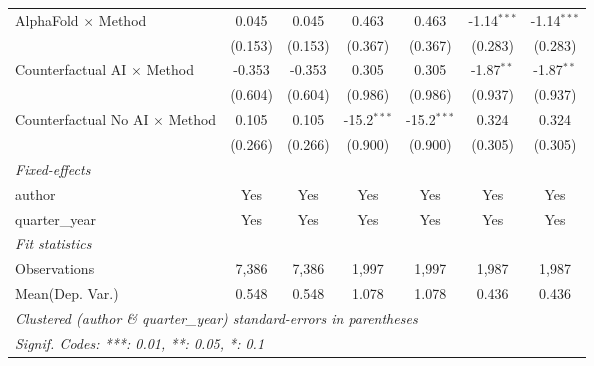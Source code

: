 \begin{tabular}{lcccccc}
   AlphaFold $\times$ Method             & 0.045         & 0.045         & 0.463         & 0.463         & -1.14$^{***}$ & -1.14$^{***}$\\   
                                         & (0.153)       & (0.153)       & (0.367)       & (0.367)       & (0.283)       & (0.283)\\   
   Counterfactual AI $\times$ Method     & -0.353        & -0.353        & 0.305         & 0.305         & -1.87$^{**}$  & -1.87$^{**}$\\   
                                         & (0.604)       & (0.604)       & (0.986)       & (0.986)       & (0.937)       & (0.937)\\   
   Counterfactual No AI $\times$ Method  & 0.105         & 0.105         & -15.2$^{***}$ & -15.2$^{***}$ & 0.324         & 0.324\\   
                                         & (0.266)       & (0.266)       & (0.900)       & (0.900)       & (0.305)       & (0.305)\\   
   \midrule
   \emph{Fixed-effects}\\
   author                                & Yes           & Yes           & Yes           & Yes           & Yes           & Yes\\  
   quarter\_year                         & Yes           & Yes           & Yes           & Yes           & Yes           & Yes\\  
   \midrule
   \emph{Fit statistics}\\
   Observations                          & 7,386         & 7,386         & 1,997         & 1,997         & 1,987         & 1,987\\  
Mean(Dep. Var.) & 0.548 & 0.548 & 1.078 & 1.078 & 0.436 & 0.436 \\
   \midrule \midrule
   \multicolumn{7}{l}{\emph{Clustered (author \& quarter\_year) standard-errors in parentheses}}\\
   \multicolumn{7}{l}{\emph{Signif. Codes: ***: 0.01, **: 0.05, *: 0.1}}\\
\end{tabular}
\par\endgroup
